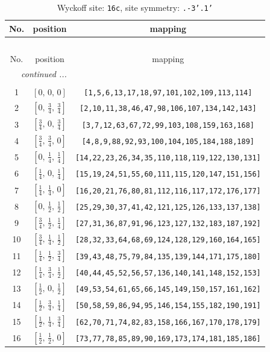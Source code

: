 \documentclass[fleqn,8pt]{jsarticle}
\begin{document}
\begin{longtable}{ccc}
\caption{Wyckoff site: {\tt 16c}, site symmetry: {\tt .-3'.1'}}
 \\
 \hline \hline
No. & position & mapping \\ \hline \endfirsthead

\multicolumn{2}{l}{\tablename\ \thetable{}} \\
 \hline \hline
No. & position & mapping \\ \hline \endhead

 \hline \hline
\multicolumn{2}{r}{\footnotesize\it continued ...} \\ \endfoot

 \hline \hline
\multicolumn{2}{r}{} \\ \endlastfoot

1 & $\left[ 0,\, 0,\, 0 \right]$ & {\tt [1,5,6,13,17,18,97,101,102,109,113,114]} \\ \hline
2 & $\left[ 0,\, \frac{3}{4},\, \frac{3}{4} \right]$ & {\tt [2,10,11,38,46,47,98,106,107,134,142,143]} \\ \hline
3 & $\left[ \frac{3}{4},\, 0,\, \frac{3}{4} \right]$ & {\tt [3,7,12,63,67,72,99,103,108,159,163,168]} \\ \hline
4 & $\left[ \frac{3}{4},\, \frac{3}{4},\, 0 \right]$ & {\tt [4,8,9,88,92,93,100,104,105,184,188,189]} \\ \hline
5 & $\left[ 0,\, \frac{1}{4},\, \frac{1}{4} \right]$ & {\tt [14,22,23,26,34,35,110,118,119,122,130,131]} \\ \hline
6 & $\left[ \frac{1}{4},\, 0,\, \frac{1}{4} \right]$ & {\tt [15,19,24,51,55,60,111,115,120,147,151,156]} \\ \hline
7 & $\left[ \frac{1}{4},\, \frac{1}{4},\, 0 \right]$ & {\tt [16,20,21,76,80,81,112,116,117,172,176,177]} \\ \hline
8 & $\left[ 0,\, \frac{1}{2},\, \frac{1}{2} \right]$ & {\tt [25,29,30,37,41,42,121,125,126,133,137,138]} \\ \hline
9 & $\left[ \frac{3}{4},\, \frac{1}{2},\, \frac{1}{4} \right]$ & {\tt [27,31,36,87,91,96,123,127,132,183,187,192]} \\ \hline
10 & $\left[ \frac{3}{4},\, \frac{1}{4},\, \frac{1}{2} \right]$ & {\tt [28,32,33,64,68,69,124,128,129,160,164,165]} \\ \hline
11 & $\left[ \frac{1}{4},\, \frac{1}{2},\, \frac{3}{4} \right]$ & {\tt [39,43,48,75,79,84,135,139,144,171,175,180]} \\ \hline
12 & $\left[ \frac{1}{4},\, \frac{3}{4},\, \frac{1}{2} \right]$ & {\tt [40,44,45,52,56,57,136,140,141,148,152,153]} \\ \hline
13 & $\left[ \frac{1}{2},\, 0,\, \frac{1}{2} \right]$ & {\tt [49,53,54,61,65,66,145,149,150,157,161,162]} \\ \hline
14 & $\left[ \frac{1}{2},\, \frac{3}{4},\, \frac{1}{4} \right]$ & {\tt [50,58,59,86,94,95,146,154,155,182,190,191]} \\ \hline
15 & $\left[ \frac{1}{2},\, \frac{1}{4},\, \frac{3}{4} \right]$ & {\tt [62,70,71,74,82,83,158,166,167,170,178,179]} \\ \hline
16 & $\left[ \frac{1}{2},\, \frac{1}{2},\, 0 \right]$ & {\tt [73,77,78,85,89,90,169,173,174,181,185,186]} \\
\end{longtable}
\end{document}
